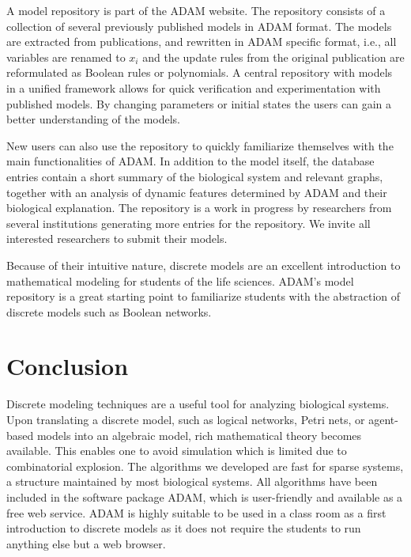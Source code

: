 \documentclass[11pt]{amsart}
\begin{document}
A model repository is part of the ADAM website. The repository consists of a collection of several previously published models in ADAM format. The models are extracted from publications, and rewritten in ADAM specific format, i.e., all variables are renamed to $x_i$ and the update rules from the original publication are reformulated as Boolean rules or polynomials. A central repository with models in a unified framework allows for quick verification and experimentation with published models. By changing parameters or initial states the users can gain a better understanding of the models.

New users can also use the repository to quickly familiarize themselves with the main functionalities of ADAM. In addition to the model itself, the database entries contain a short summary of the biological system and relevant graphs, together with an analysis of dynamic features determined by ADAM and their biological explanation. The repository is a work in progress by researchers from several institutions generating more entries for the repository.  We invite all interested researchers to submit their models. 
 
 
Because of their intuitive nature, discrete models are an excellent introduction to mathematical modeling for students of the life sciences. ADAM's model repository is a great starting point to familiarize students with the abstraction of discrete models such as Boolean networks.
\section{Conclusion}
Discrete modeling techniques are a useful tool for analyzing biological
systems. Upon translating a discrete model, such as logical networks,
Petri nets, or agent-based models into an algebraic model, rich mathematical
theory becomes available. This enables one to
avoid simulation which is limited due to combinatorial explosion. The algorithms
we developed are fast for sparse systems, a structure maintained by most biological
systems. All algorithms have been included in the software package ADAM\cite{ADAM},
which is user-friendly and available as a free web service.
ADAM is highly suitable to be used in a class room as a first
introduction to discrete models as it does not require the students to run
anything else but a web browser.
\end{document}
